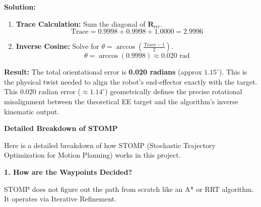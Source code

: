 \documentclass[11pt, a4paper]{article}
\begin{document}
\textbf{Solution:}
\begin{enumerate}
    \item \textbf{Trace Calculation:} Sum the diagonal of $\mathbf{R}_{\text{err}}$.
    \begin{equation*}
        \text{Trace} = 0.9998 + 0.9998 + 1.0000 = 2.9996
    \end{equation*}
    \item \textbf{Inverse Cosine:} Solve for $\theta = \arccos \left( \frac{\text{Trace} - 1}{2} \right)$.
    \begin{equation*}
        \theta = \arccos (0.9998) \approx 0.020 \text{ rad}
    \end{equation*}
\end{enumerate}

\textbf{Result:} The total orientational error is \textbf{0.020 radians} (approx $1.15^\circ$). This is the physical twist needed to align the robot's end-effector exactly with the target.
This $0.020$ radian error ($\approx 1.14^\circ$) geometrically defines the precise rotational misalignment between the theoretical EE target and the algorithm's inverse kinematic output.

\clearpage


{\Large\textbf{Detailed Breakdown of STOMP}}

Here is a detailed breakdown of how STOMP (Stochastic Trajectory Optimization for Motion Planning) works in this project.

\vspace{0.4cm}
{\large\textbf{1. How are the Waypoints Decided?}}

STOMP does not figure out the path from scratch like an A* or RRT algorithm. It operates via Iterative Refinement.
\end{document}
